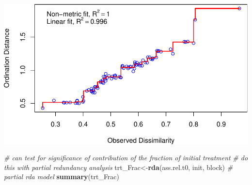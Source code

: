 \documentclass[
]{article}
\newenvironment{Shaded}{\begin{snugshade}}{\end{snugshade}}
\newcommand{\CommentTok}[1]{\textcolor[rgb]{0.56,0.35,0.01}{\textit{#1}}}
\newcommand{\FunctionTok}[1]{\textcolor[rgb]{0.13,0.29,0.53}{\textbf{#1}}}
\newcommand{\NormalTok}[1]{#1}
\newcommand{\OtherTok}[1]{\textcolor[rgb]{0.56,0.35,0.01}{#1}}
\begin{document}
\includegraphics{log-project-aubrie-winnie_files/figure-latex/unnamed-chunk-4-1.pdf}

\begin{Shaded}
\begin{Highlighting}[]
\CommentTok{\# can test for significance of contribution of the fraction of initial treatment}
\CommentTok{\# do this with partial redundancy analysis}
\NormalTok{trt\_Frac}\OtherTok{\textless{}{-}}\FunctionTok{rda}\NormalTok{(ass.rel.t0, init, block) }\CommentTok{\# partial rda model}
\FunctionTok{summary}\NormalTok{(trt\_Frac)}
\end{Highlighting}
\end{Shaded}
\end{document}
